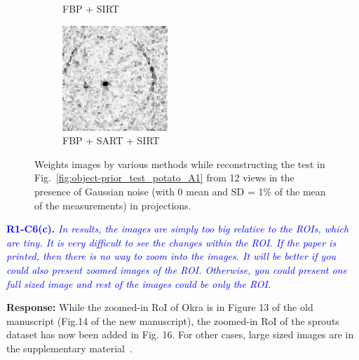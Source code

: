 \documentclass{article}
\begin{document}
\begin{figure}[!h]
\begin{subfigure}[b]{0.2\linewidth}
\captionsetup{labelformat=empty}
        \caption{FBP + SIRT}
    \end{subfigure}
    \quad
        \begin{subfigure}[b]{0.2\linewidth}
        \includegraphics[width=\textwidth]{../images/potato/artefacts/with_noise/weightsIm_fbp_sart_sirt30.png}
\captionsetup{labelformat=empty}
        \caption{FBP + SART + SIRT}
     \end{subfigure}
      \caption{Weights images by various methods while reconstructing the test in Fig.~\ref{fig:object-prior_test_potato_A1} from 12 views in the presence of Gaussian noise (with 0 mean and SD = 1$\%$ of the mean of the measurements) in projections.}
\label{fig:weights_with_noise}
\end{figure}
\textcolor{blue}{\textbf{R1-C6(c).}\textit{ In results, the images are simply too big relative to the ROIs, which are tiny. It is very difficult to see the changes within the ROI. If the paper is printed, then there is no way to zoom into the images. It will be better if you could also present zoomed images of the ROI. Otherwise, you could present one full sized image and rest of the images could be only the ROI. }}

\textbf{Response:} While the zoomed-in RoI of Okra is in Figure 13 of the old manuscript (Fig.14 of the new manuscript), the zoomed-in RoI of the sprouts dataset has now been added in Fig. 16.  For other cases, large sized images are in the supplementary material~\cite{supp_paper}.\\
\end{document}

